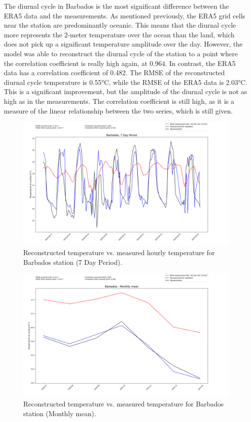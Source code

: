 The diurnal cycle in Barbados is the most significant difference between the ERA5 data and the measurements.
As mentioned previously, the ERA5 grid cells near the station are predominantly oceanic.
This means that the diurnal cycle more represents the 2-meter temperature over the ocean than the land, which does not pick up a significant temperature amplitude over the day.
However, the model was able to reconstruct the diurnal cycle of the station to a point where the correlation coefficient is really high again, at 0.964.
In contrast, the ERA5 data has a correlation coefficient of 0.482.
The RMSE of the reconstructed diurnal cycle temperature is 0.55°C, while the RMSE of the ERA5 data is 2.03°C.
This is a significant improvement, but the amplitude of the diurnal cycle is not as high as in the measurements.
The correlation coefficient is still high, as it is a measure of the linear relationship between the two series, which is still given.

\begin{figure}
    \centering
    \includegraphics[width=1.00\textwidth]{resources/images/charts/barbados_eval_grib_final/Barbados, 7 Day Period_1_2.png}
    \caption{Reconstructed temperature vs. measured hourly temperature for Barbados station (7 Day Period).}
\end{figure}

\begin{figure}
    \centering
    \includegraphics[width=1.00\textwidth]{resources/images/charts/barbados_eval_grib_final/Barbados - Monthly mean.png}
    \caption{Reconstructed temperature vs. measured temperature for Barbados station (Monthly mean).}
\end{figure}

